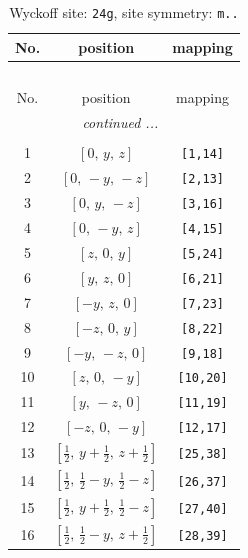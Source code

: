 \documentclass[fleqn,8pt]{jsarticle}
\begin{document}
\renewcommand{\arraystretch}{1.2}
\begin{longtable}{ccc}
\caption{Wyckoff site: {\tt 24g}, site symmetry: {\tt m..}}
 \\
 \hline \hline
No. & position & mapping \\ \hline \endfirsthead

\multicolumn{2}{l}{\tablename\ \thetable{}} \\
 \hline \hline
No. & position & mapping \\ \hline \endhead

 \hline \hline
\multicolumn{2}{r}{\footnotesize\it continued ...} \\ \endfoot

 \hline \hline
\multicolumn{2}{r}{} \\ \endlastfoot

1 & $\left[ 0,\, y,\, z \right]$ & {\tt [1,14]} \\ \hline
2 & $\left[ 0,\, - y,\, - z \right]$ & {\tt [2,13]} \\ \hline
3 & $\left[ 0,\, y,\, - z \right]$ & {\tt [3,16]} \\ \hline
4 & $\left[ 0,\, - y,\, z \right]$ & {\tt [4,15]} \\ \hline
5 & $\left[ z,\, 0,\, y \right]$ & {\tt [5,24]} \\ \hline
6 & $\left[ y,\, z,\, 0 \right]$ & {\tt [6,21]} \\ \hline
7 & $\left[ - y,\, z,\, 0 \right]$ & {\tt [7,23]} \\ \hline
8 & $\left[ - z,\, 0,\, y \right]$ & {\tt [8,22]} \\ \hline
9 & $\left[ - y,\, - z,\, 0 \right]$ & {\tt [9,18]} \\ \hline
10 & $\left[ z,\, 0,\, - y \right]$ & {\tt [10,20]} \\ \hline
11 & $\left[ y,\, - z,\, 0 \right]$ & {\tt [11,19]} \\ \hline
12 & $\left[ - z,\, 0,\, - y \right]$ & {\tt [12,17]} \\ \hline
13 & $\left[ \frac{1}{2},\, y + \frac{1}{2},\, z + \frac{1}{2} \right]$ & {\tt [25,38]} \\ \hline
14 & $\left[ \frac{1}{2},\, \frac{1}{2} - y,\, \frac{1}{2} - z \right]$ & {\tt [26,37]} \\ \hline
15 & $\left[ \frac{1}{2},\, y + \frac{1}{2},\, \frac{1}{2} - z \right]$ & {\tt [27,40]} \\ \hline
16 & $\left[ \frac{1}{2},\, \frac{1}{2} - y,\, z + \frac{1}{2} \right]$ & {\tt [28,39]} \\ \hline

\end{longtable}
\end{document}
